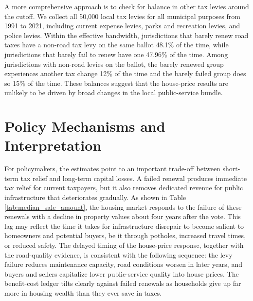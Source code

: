A more comprehensive approach is to check for balance in other tax levies around the cutoff. We collect all 50,000 local tax levies for all municipal purposes from 1991 to 2021, including current expense levies, parks and recreation levies, and police levies. Within the effective bandwidth, jurisdictions that barely renew road taxes have a non-road tax levy on the same ballot 48.1\% of the time, while jurisdictions that barely fail to renew have one 47.96\% of the time. Among jurisdictions with non-road levies on the ballot, the barely renewed group experiences another tax change 12\% of the time and the barely failed group does so 15\% of the time. These balances suggest that the house-price results are unlikely to be driven by broad changes in the local public-service bundle.

































\section{Policy Mechanisms and Interpretation} \label{sec:mech}

For policymakers, the estimates point to an important trade-off between short-term tax relief and long-term capital losses. A failed renewal produces immediate tax relief for current taxpayers, but it also removes dedicated revenue for public infrastructure that deteriorates gradually. As shown in Table \ref{tab:median_sale_amount}, the housing market responds to the failure of these renewals with a decline in property values about four years after the vote. This lag may reflect the time it takes for infrastructure disrepair to become salient to homeowners and potential buyers, be it through potholes, increased travel times, or reduced safety. The delayed timing of the house-price response, together with the road-quality evidence, is consistent with the following sequence: the levy failure reduces maintenance capacity, road conditions worsen in later years, and buyers and sellers capitalize lower public-service quality into house prices. The benefit-cost ledger tilts clearly against failed renewals as households give up far more in housing wealth than they ever save in taxes.


